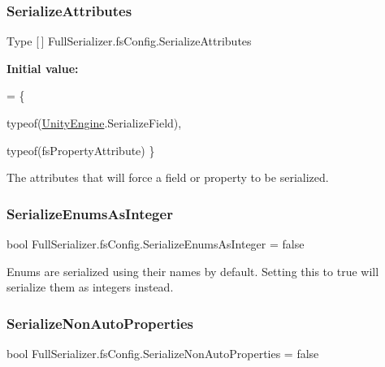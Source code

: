 \subsubsection{\texorpdfstring{Serialize\+Attributes}{SerializeAttributes}}
{\footnotesize\ttfamily Type \mbox{[}$\,$\mbox{]} Full\+Serializer.\+fs\+Config.\+Serialize\+Attributes}

{\bfseries Initial value\+:}
\begin{DoxyCode}
= \{

            typeof(\hyperlink{namespace_unity_engine}{UnityEngine}.SerializeField),

            typeof(fsPropertyAttribute)
        \}
\end{DoxyCode}


The attributes that will force a field or property to be serialized. 

\mbox{\label{class_full_serializer_1_1fs_config_ab8a128737e284c273b5e0e8826435416}} 
\subsubsection{\texorpdfstring{Serialize\+Enums\+As\+Integer}{SerializeEnumsAsInteger}}
{\footnotesize\ttfamily bool Full\+Serializer.\+fs\+Config.\+Serialize\+Enums\+As\+Integer = false}



Enums are serialized using their names by default. Setting this to true will serialize them as integers instead. 

\mbox{\label{class_full_serializer_1_1fs_config_a7ec5433d4b0ded151c6febe5720a434c}} 
\subsubsection{\texorpdfstring{Serialize\+Non\+Auto\+Properties}{SerializeNonAutoProperties}}
{\footnotesize\ttfamily bool Full\+Serializer.\+fs\+Config.\+Serialize\+Non\+Auto\+Properties = false}




